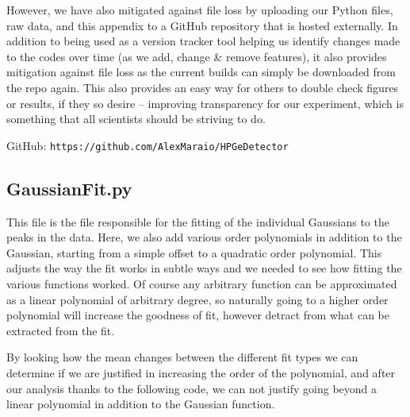 \documentclass[11pt,a4paper]{article}
\begin{document}
However, we have also mitigated against file loss by uploading our Python files, raw data, and this appendix to a GitHub repository that is hosted externally. In addition to being used as a version tracker tool helping us identify changes made to the codes over time (as we add, change \& remove features), it also provides mitigation against file loss as the current builds can simply be downloaded from the repo again. This also provides an easy way for others to double check figures or results, if they so desire -- improving transparency for our experiment, which is something that all scientists should be striving to do. 

GitHub: \texttt{https://github.com/AlexMaraio/HPGeDetector}


\subsection{GaussianFit.py}
This file is the file responsible for the fitting of the individual Gaussians to the peaks in the data. Here, we also add various order polynomials in addition to the Gaussian, starting from a simple offset to a quadratic order polynomial. This adjusts the way the fit works in subtle ways and we needed to see how fitting the various functions worked. Of course any arbitrary function can be approximated as a linear polynomial of arbitrary degree, so naturally going to a higher order polynomial will increase the goodness of fit, however detract from what can be extracted from the fit. 

By looking how the mean changes between the different fit types we can determine if we are justified in increasing the order of the polynomial, and after our analysis thanks to the following code, we can not justify going beyond a linear polynomial in addition to the Gaussian function.
\end{document}

